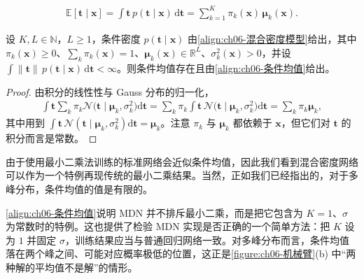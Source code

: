 \documentclass[../../main.tex]{subfiles}
\begin{document}
\begin{align}
\mathbb{E}[\boldsymbol{t}\mid\boldsymbol{x}]=\int\boldsymbol{t}\,p(\boldsymbol{t}\mid\boldsymbol{x})\,\mathrm{d}\boldsymbol{t}=\sum_{k=1}^{K}\pi_k(\boldsymbol{x})\,\boldsymbol{\mu}_k(\boldsymbol{x}).
\label{align:ch06-条件均值}
\end{align}

\begin{proposition}[条件均值]\label{proposition:ch06-条件均值}
设 $K,L\in\mathbb{N}$，$L\geqslant1$，条件密度 $p(\boldsymbol{t}\mid\boldsymbol{x})$ 由\eqref{align:ch06-混合密度模型}给出，其中 $\pi_{k}(\boldsymbol{x})\geqslant0$、$\sum_{k}\pi_{k}(\boldsymbol{x})=1$、$\boldsymbol{\mu}_{k}(\boldsymbol{x})\in\mathbb{R}^{L}$、$\sigma_{k}^{2}(\boldsymbol{x})>0$，并设 $\int\|\boldsymbol{t}\|\,p(\boldsymbol{t}\mid\boldsymbol{x})\,\mathrm{d}\boldsymbol{t}<\infty$。则条件均值存在且由\eqref{align:ch06-条件均值}给出。
\end{proposition}

\begin{proof}
由积分的线性性与 Gauss 分布的归一化，
\begin{align}
\int\boldsymbol{t}\sum_{k}\pi_k\mathcal{N}\bigl(\boldsymbol{t}\mid\boldsymbol{\mu}_k,\sigma_k^{2}\bigr)\mathrm{d}\boldsymbol{t}
=\sum_{k}\pi_k\int\boldsymbol{t}\,\mathcal{N}\bigl(\boldsymbol{t}\mid\boldsymbol{\mu}_k,\sigma_k^{2}\bigr)\mathrm{d}\boldsymbol{t}
=\sum_{k}\pi_k\boldsymbol{\mu}_k,
\end{align}
其中用到 $\int\boldsymbol{t}\,\mathcal{N}(\boldsymbol{t}\mid\boldsymbol{\mu}_k,\sigma_k^{2})\mathrm{d}\boldsymbol{t}=\boldsymbol{\mu}_k$。注意 $\pi_k$ 与 $\boldsymbol{\mu}_k$ 都依赖于 $\boldsymbol{x}$，但它们对 $\boldsymbol{t}$ 的积分而言是常数。
\end{proof}

由于使用最小二乘法训练的标准网络会近似条件均值，因此我们看到混合密度网络可以作为一个特例再现传统的最小二乘结果。当然，正如我们已经指出的，对于多峰分布，条件均值的值是有限的。

\begin{remark}\eqref{align:ch06-条件均值}说明 MDN 并不排斥最小二乘，而是把它包含为 $K=1$、$\sigma$ 为常数时的特例。这也提供了检验 MDN 实现是否正确的一个简单方法：把 $K$ 设为 $1$ 并固定 $\sigma$，训练结果应当与普通回归网络一致。对多峰分布而言，条件均值落在两个峰之间、可能对应概率极低的位置，这正是\cref{figure:ch06-机械臂}(b) 中“两种解的平均值不是解”的情形。
\end{remark}
\end{document}
